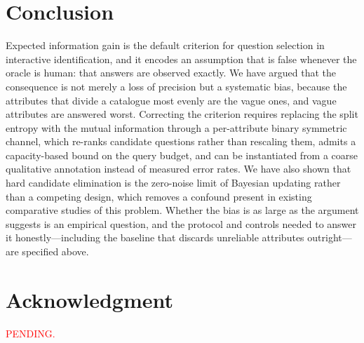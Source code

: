 \documentclass[conference]{IEEEtran}
\begin{document}
\section{Conclusion}

Expected information gain is the default criterion for question selection in
interactive identification, and it encodes an assumption that is false whenever
the oracle is human: that answers are observed exactly. We have argued that the
consequence is not merely a loss of precision but a systematic bias, because
the attributes that divide a catalogue most evenly are the vague ones, and
vague attributes are answered worst. Correcting the criterion requires
replacing the split entropy with the mutual information through a per-attribute
binary symmetric channel, which re-ranks candidate questions rather than
rescaling them, admits a capacity-based bound on the query budget, and can be
instantiated from a coarse qualitative annotation instead of measured error
rates. We have also shown that hard candidate elimination is the zero-noise
limit of Bayesian updating rather than a competing design, which removes a
confound present in existing comparative studies of this problem. Whether the
bias is as large as the argument suggests is an empirical question, and the
protocol and controls needed to answer it honestly---including the baseline
that discards unreliable attributes outright---are specified above.

\section*{Acknowledgment}

\textcolor{red}{PENDING.}



\end{document}
